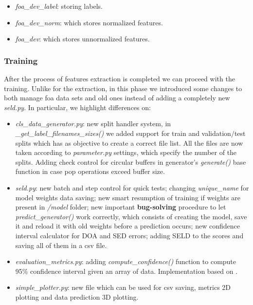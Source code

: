 \documentclass[11pt]{article}
\begin{document}
\begin{itemize}
	\item \textit{foa\_dev\_label}: storing labels.
	\item \textit{foa\_dev\_norm}: which stores normalized features.
	\item \textit{foa\_dev}: which stores unnormalized features.
\end{itemize}



\subsubsection{Training}\label{minisec:train}

After the process of features extraction is completed we can proceed with the training. Unlike for the extraction, in this phase we introduced some changes to both manage foa data sets and old ones instead of adding a completely new \textit{seld.py}. In particular, we highlight differences on:

\begin{itemize}
	\item \textit{cls\_data\_generator.py}: new split handler system, in \textit{\_get\_label\_filenames\_sizes()} we added support for train and validation$/$test splits which has as objective to create a correct file list. All the files are now taken according to \textit{parameter.py} settings, which specify the number of the splits. Adding check control for circular buffers in generator's \textit{generate()} base function in case pop operations exceed buffer size. 
	\item \textit{seld.py}: new batch and step control for quick tests; changing \textit{unique\_name} for model weights data saving; new smart resumption of training if weights are present in \textit{/model} folder; new important \textbf{bug-solving} procedure to let \textit{predict\_generator()} work correctly, which consists of creating the model, save it and reload it with old weights before a prediction occurs; new confidence interval calculator for DOA and SED errors; adding SELD to the scores and saving all of them in a csv file.
	\item \textit{evaluation\_metrics.py}: adding \textit{compute\_confidence()} function to compute 95\% confidence interval given an array of data. Implementation based on \cite{confint}.
	\item \textit{simple\_plotter.py}: new file which can be used for csv saving, metrics 2D plotting and data prediction 3D plotting.
\end{itemize}
\end{document}
